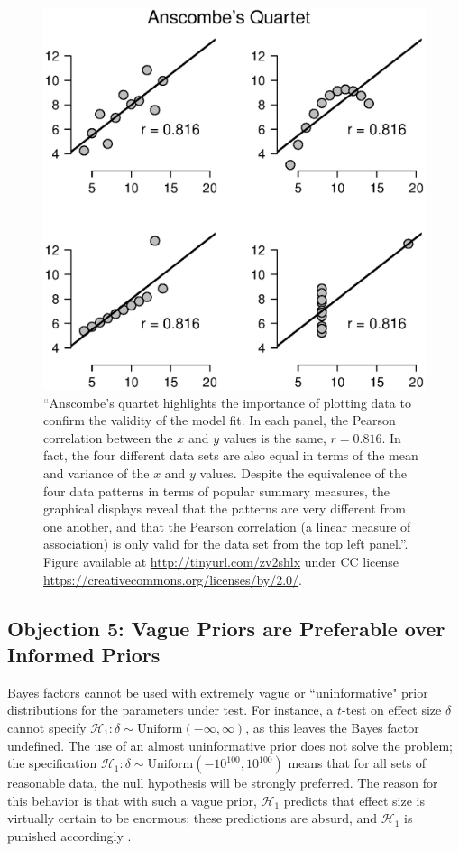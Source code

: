 \begin{figure}[!t]
    \begin{center}
        \includegraphics[width=.8\textwidth]{figs/bi1_AnscombesQuartet.eps}
        \caption{``Anscombe's quartet highlights the importance of plotting data to confirm the validity of the model fit. In each panel, the Pearson correlation between the $x$ and $y$ values is the same, $r = 0.816$. In fact, the four different data sets are also equal in terms of the mean and variance of the $x$ and $y$ values. Despite the equivalence of the four data patterns in terms of popular summary measures, the graphical displays reveal that the patterns are very different from one another, and that the Pearson correlation (a linear measure of association) is only valid for the data set from the top left panel.''\protect \cite[p. 34]{HeathcoteEtAl2015}. Figure available at \protect \url{http://tinyurl.com/zv2shlx} under CC license \protect \url{https://creativecommons.org/licenses/by/2.0/}.}\label{fig:bi1:AnscombesQuartet}
    \end{center}
\end{figure}

\subsection{Objection 5: Vague Priors are Preferable over Informed Priors}
Bayes factors cannot be used with extremely vague or ``uninformative" prior distributions for the parameters under test. For instance, a $t$-test on effect size $\delta$ cannot specify $\mathcal{H}_1: \delta \sim \text{Uniform}(-\infty, \infty)$, as this leaves the Bayes factor undefined. The use of an almost uninformative prior does not solve the problem; the specification $\mathcal{H}_1: \delta \sim \text{Uniform}(-10^{100}, 10^{100})$ means that for all sets of reasonable data, the null hypothesis will be strongly preferred. The reason for this behavior is that with such a vague prior, $\mathcal{H}_1$ predicts that effect size is virtually certain to be enormous; these predictions are absurd, and $\mathcal{H}_1$ is punished accordingly \cite{RouderMorey2012Regression}.

